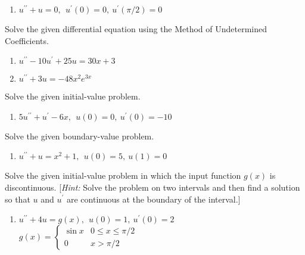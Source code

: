 \begin{fullwidth}
\begin{enumerate}[resume]
\vspace{1.0cm}

\item $u^{\prime \prime}+u =0, \ \ u^{\prime}(0)=0, \ u^{\prime}(\pi/2)=0$

\vspace{1.0cm}

\end{enumerate}

Solve the given differential equation using the Method of Undetermined Coefficients.

\begin{enumerate}[resume]
\item $u^{\prime \prime}-10u^{\prime}+25u=30x+3$

\vspace{1.0cm}

\item $u^{\prime \prime}+3u=-48x^2e^{3x}$

\vspace{1.0cm}
\end{enumerate}

Solve the given initial-value problem.

\begin{enumerate}[resume]
\item $5u^{\prime \prime} + u^{\prime} - 6x, \ \ u(0)=0, \ u^{\prime}(0)=-10$

\vspace{1.0cm}

\end{enumerate}

Solve the given boundary-value problem.

\begin{enumerate}[resume]
\item $u^{\prime \prime}+u=x^2+1, \ \ u(0)=5, \ u(1)=0$

\vspace{1.0cm}

\end{enumerate}

Solve the given initial-value problem in which the input function $g(x)$ is discontinuous. [\emph{Hint:} Solve the problem on two intervals and then find a solution so that $u$ and $u^{\prime}$ are continuous at the boundary of the interval.]

\begin{enumerate}[resume]
\item $u^{\prime \prime}+4u=g(x), \ \ u(0)=1, \ u^{\prime}(0)=2$
\begin{equation*}
g(x) = 
\begin{cases}
\sin{x} & 0 \le x \le \pi/2 \\
0 & x > \pi/2
\end{cases}
\hspace{12cm}
\end{equation*}

\end{enumerate}


\end{fullwidth}
